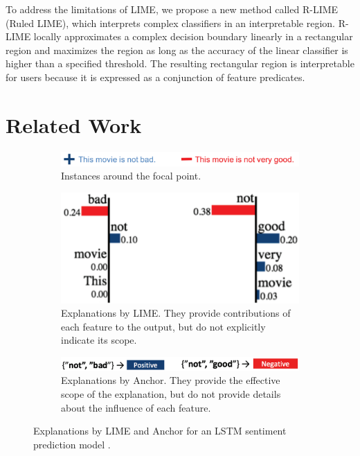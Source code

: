 \documentclass[runningheads]{llncs}
\begin{document}
To address the limitations of LIME,
we propose a new method called R-LIME (Ruled LIME),
which interprets complex classifiers in an interpretable region.
R-LIME locally approximates a complex decision boundary linearly
in a rectangular region and maximizes the region as long as the accuracy of the linear
classifier is higher than a specified threshold.
The resulting rectangular region is interpretable for users because it is
expressed as a conjunction of feature predicates.

\section{Related Work}
\begin{figure}[t]
  \centering
  \vspace{0.5cm}
  \begin{subfigure}[t]{0.55\textwidth}
    \centering
    \includegraphics[width=\textwidth]{lime_vs_anchor_exp_a.png}
    \caption{Instances around the focal point.}\label{fig:lime_vs_anchor_exp_a}
    \vspace{0.5cm}
  \end{subfigure}
  \begin{subfigure}[t]{0.45\textwidth}
    \centering
    \includegraphics[width=\textwidth]{lime_vs_anchor_exp_b.png}
    \caption{%
      Explanations by LIME.
      They provide contributions of each feature to the output,
      but do not explicitly indicate its scope.
    }\label{fig:lime_vs_anchor_exp_b}
    \vspace{0.5cm}
  \end{subfigure}
  \begin{subfigure}[t]{0.55\textwidth}
    \centering
    \includegraphics[width=\textwidth]{lime_vs_anchor_exp_c.png}
    \caption{%
      Explanations by Anchor.
      They provide the effective scope of the explanation,
      but do not provide details about the influence of each feature.
    }\label{fig:lime_vs_anchor_exp_c}
  \end{subfigure}
  \caption{%
    Explanations by LIME and Anchor
    for an LSTM sentiment prediction model \cite{ribeiro2018anchors}.
  }\label{fig:lime_vs_anchor_exp}
\end{figure}
\end{document}
